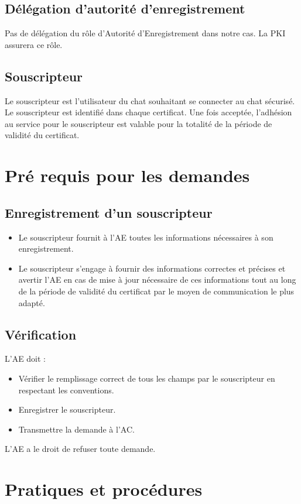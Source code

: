 \documentclass[a4paper,11pt,french]{article}
\begin{document}
\subsection{Délégation d'autorité d'enregistrement}
Pas de délégation du rôle d’Autorité d’Enregistrement dans notre cas. La PKI assurera ce rôle.

\subsection{Souscripteur}
Le souscripteur est l’utilisateur du chat souhaitant se connecter au chat sécurisé. Le souscripteur est identifié dans chaque certificat. Une fois acceptée, l’adhésion au service pour le souscripteur est valable pour la totalité de la période de validité du certificat.

\section{Pré requis pour les demandes}
\subsection{Enregistrement d'un souscripteur}
\begin{itemize}
\item Le souscripteur fournit à l’AE toutes les informations nécessaires à son enregistrement. 
\item Le souscripteur s'engage à fournir des informations correctes et précises et avertir l’AE en cas de mise à jour nécessaire de ces informations tout au long de la période de validité du certificat par le moyen de communication le plus adapté.
\end{itemize}

\subsection{Vérification}
L’AE doit :
\begin{itemize}
\item Vérifier le remplissage correct de tous les champs par le souscripteur en respectant les conventions.
\item Enregistrer le souscripteur.
\item Transmettre la demande à l'AC.
\end{itemize}
L’AE a le droit de refuser toute demande.

\section{Pratiques et procédures}
\end{document}
